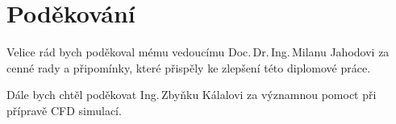 \null{}
\vfill
\section*{Poděkování}
Velice rád bych poděkoval mému vedoucímu Doc.\,Dr.\,Ing.\,Milanu Jahodovi za cenné rady a připomínky, které přispěly ke zlepšení této diplomové práce.

Dále bych chtěl poděkovat Ing.\,Zbyňku Kálalovi za významnou pomoct při přípravě CFD simulací.
\vspace{25mm}
